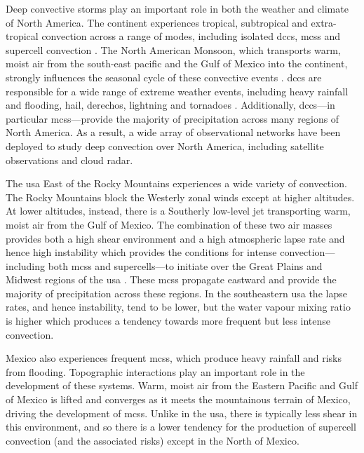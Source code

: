 Deep convective storms play an important role in both the weather and climate of North America.
The continent experiences tropical, subtropical and extra-tropical convection across a range of modes, including isolated \acrshort{dcc}s, \acrshort{mcs}s and supercell convection \citep{brooks_century_2019}.
The North American Monsoon, which transports warm, moist air from the south-east pacific and the Gulf of Mexico into the continent, strongly influences the seasonal cycle of these convective events \citep{adams_north_1997, higgins_intercomparison_2001}.
\acrshort{dcc}s are responsible for a wide range of extreme weather events, including heavy rainfall and flooding, hail, derechos, lightning and tornadoes \citep{westra_future_2014, houze_chapter_2014, williams_radar_1992, bruning_theory_2013, punge_hail_2016, matsudo_severe_2011}.
Additionally, \acrshort{dcc}s---in particular \acrshort{mcs}s---provide the majority of precipitation across many regions of North America.
As a result, a wide array of observational networks have been deployed to study deep convection over North America, including satellite observations and cloud radar.

The \acrshort{usa} East of the Rocky Mountains experiences a wide variety of convection.
The Rocky Mountains block the Westerly zonal winds except at higher altitudes.
At lower altitudes, instead, there is a Southerly low-level jet transporting warm, moist air from the Gulf of Mexico.
The combination of these two air masses provides both a high shear environment and a high atmospheric lapse rate and hence high instability which provides the conditions for intense convection---including both \acrshort{mcs}s and supercells---to initiate over the Great Plains and Midwest regions of the \acrshort{usa} \citep{coniglio_environmental_2010, song_contrasting_2019}.
These \acrshort{mcs}s propagate eastward and provide the majority of precipitation across these regions.
In the southeastern \acrshort{usa} the lapse rates, and hence instability, tend to be lower, but the water vapour mixing ratio is higher which produces a tendency towards more frequent but less intense convection.

Mexico also experiences frequent \acrshort{mcs}s, which produce heavy rainfall and risks from flooding.
Topographic interactions play an important role in the development of these systems.
Warm, moist air from the Eastern Pacific and Gulf of Mexico is lifted and converges as it meets the mountainous terrain of Mexico, driving the development of \acrshort{mcs}s.
Unlike in the \acrshort{usa}, there is typically less shear in this environment, and so there is a lower tendency for the production of supercell convection (and the associated risks) except in the North of Mexico.

